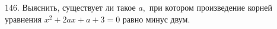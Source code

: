 146. Выяснить, существует ли такое $a,$ при котором произведение корней уравнения $x^2+2ax+a+3=0$ равно минус двум.\\
